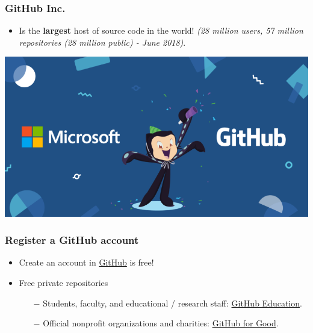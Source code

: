 \documentclass[svgnames]{beamer}
\begin{document}
\begin{frame}
\frametitle{GitHub Inc.}
\begin{itemize}
\item Is the \textbf{largest} host of source code in the world! \emph{(28 million users, 57 million repositories (28 million public) - June 2018)}.
\end{itemize}

\begin{center}
\includegraphics[scale=0.35]{img/microsoft-github-800x421.png}
\end{center}  

\end{frame}


\begin{frame}
\frametitle{Register a GitHub account}
  \begin{itemize}
    \item Create an account in \href{https://github.com/}{ GitHub} is free! \hfill \break
    \item Free private repositories
        \begin{itemize}
        \item[$-$] Students, faculty, and educational / research staff: \href{https://education.github.com/}{ GitHub Education}.
        \item[$-$] Official nonprofit organizations and charities: \href{https://github.com/nonprofit}{ GitHub for Good}.
       \end{itemize}
        
\end{itemize}
\end{frame}
\end{document}
